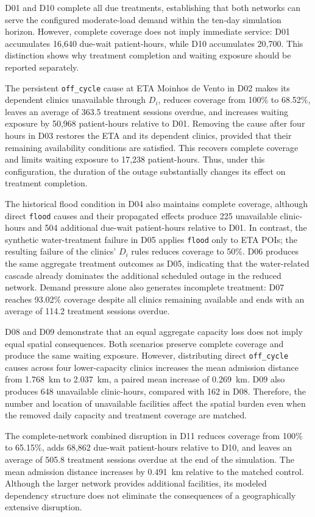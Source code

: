 D01 and D10 complete all due treatments, establishing that both networks can serve the configured moderate-load demand within the ten-day simulation horizon. However, complete coverage does not imply immediate service: D01 accumulates 16,640 due-wait patient-hours, while D10 accumulates 20,700. This distinction shows why treatment completion and waiting exposure should be reported separately.

The persistent \texttt{off\_cycle} cause at ETA Moinhos de Vento in D02 makes its dependent clinics unavailable through $D_i$, reduces coverage from 100\% to 68.52\%, leaves an average of 363.5 treatment sessions overdue, and increases waiting exposure by 50,968 patient-hours relative to D01. Removing the cause after four hours in D03 restores the ETA and its dependent clinics, provided that their remaining availability conditions are satisfied. This recovers complete coverage and limits waiting exposure to 17,238 patient-hours. Thus, under this configuration, the duration of the outage substantially changes its effect on treatment completion.

The historical flood condition in D04 also maintains complete coverage, although direct \texttt{flood} causes and their propagated effects produce 225 unavailable clinic-hours and 504 additional due-wait patient-hours relative to D01. In contrast, the synthetic water-treatment failure in D05 applies \texttt{flood} only to ETA POIs; the resulting failure of the clinics' $D_i$ rules reduces coverage to 50\%. D06 produces the same aggregate treatment outcomes as D05, indicating that the water-related cascade already dominates the additional scheduled outage in the reduced network. Demand pressure alone also generates incomplete treatment: D07 reaches 93.02\% coverage despite all clinics remaining available and ends with an average of 114.2 treatment sessions overdue.

D08 and D09 demonstrate that an equal aggregate capacity loss does not imply equal spatial consequences. Both scenarios preserve complete coverage and produce the same waiting exposure. However, distributing direct \texttt{off\_cycle} causes across four lower-capacity clinics increases the mean admission distance from 1.768~km to 2.037~km, a paired mean increase of 0.269~km. D09 also produces 648 unavailable clinic-hours, compared with 162 in D08. Therefore, the number and location of unavailable facilities affect the spatial burden even when the removed daily capacity and treatment coverage are matched.

The complete-network combined disruption in D11 reduces coverage from 100\% to 65.15\%, adds 68,862 due-wait patient-hours relative to D10, and leaves an average of 505.8 treatment sessions overdue at the end of the simulation. The mean admission distance increases by 0.491~km relative to the matched control. Although the larger network provides additional facilities, its modeled dependency structure does not eliminate the consequences of a geographically extensive disruption.


